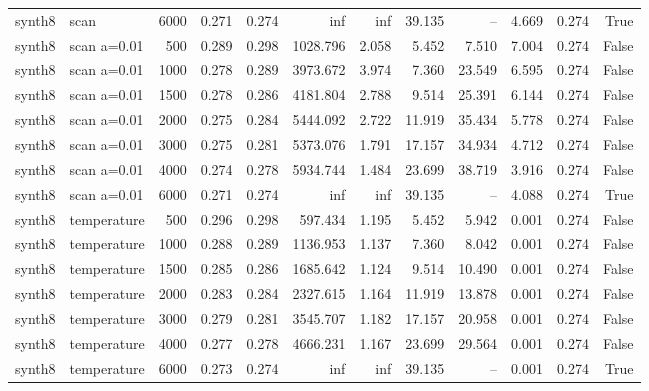 \begin{tabular}{llrrrrrrrrrr}
synth8 & scan & 6000 & 0.271 & 0.274 & inf & inf & 39.135 & -- & 4.669 & 0.274 & True \\
synth8 & scan a=0.01 & 500 & 0.289 & 0.298 & 1028.796 & 2.058 & 5.452 & 7.510 & 7.004 & 0.274 & False \\
synth8 & scan a=0.01 & 1000 & 0.278 & 0.289 & 3973.672 & 3.974 & 7.360 & 23.549 & 6.595 & 0.274 & False \\
synth8 & scan a=0.01 & 1500 & 0.278 & 0.286 & 4181.804 & 2.788 & 9.514 & 25.391 & 6.144 & 0.274 & False \\
synth8 & scan a=0.01 & 2000 & 0.275 & 0.284 & 5444.092 & 2.722 & 11.919 & 35.434 & 5.778 & 0.274 & False \\
synth8 & scan a=0.01 & 3000 & 0.275 & 0.281 & 5373.076 & 1.791 & 17.157 & 34.934 & 4.712 & 0.274 & False \\
synth8 & scan a=0.01 & 4000 & 0.274 & 0.278 & 5934.744 & 1.484 & 23.699 & 38.719 & 3.916 & 0.274 & False \\
synth8 & scan a=0.01 & 6000 & 0.271 & 0.274 & inf & inf & 39.135 & -- & 4.088 & 0.274 & True \\
synth8 & temperature & 500 & 0.296 & 0.298 & 597.434 & 1.195 & 5.452 & 5.942 & 0.001 & 0.274 & False \\
synth8 & temperature & 1000 & 0.288 & 0.289 & 1136.953 & 1.137 & 7.360 & 8.042 & 0.001 & 0.274 & False \\
synth8 & temperature & 1500 & 0.285 & 0.286 & 1685.642 & 1.124 & 9.514 & 10.490 & 0.001 & 0.274 & False \\
synth8 & temperature & 2000 & 0.283 & 0.284 & 2327.615 & 1.164 & 11.919 & 13.878 & 0.001 & 0.274 & False \\
synth8 & temperature & 3000 & 0.279 & 0.281 & 3545.707 & 1.182 & 17.157 & 20.958 & 0.001 & 0.274 & False \\
synth8 & temperature & 4000 & 0.277 & 0.278 & 4666.231 & 1.167 & 23.699 & 29.564 & 0.001 & 0.274 & False \\
synth8 & temperature & 6000 & 0.273 & 0.274 & inf & inf & 39.135 & -- & 0.001 & 0.274 & True \\
\bottomrule
\end{tabular}
